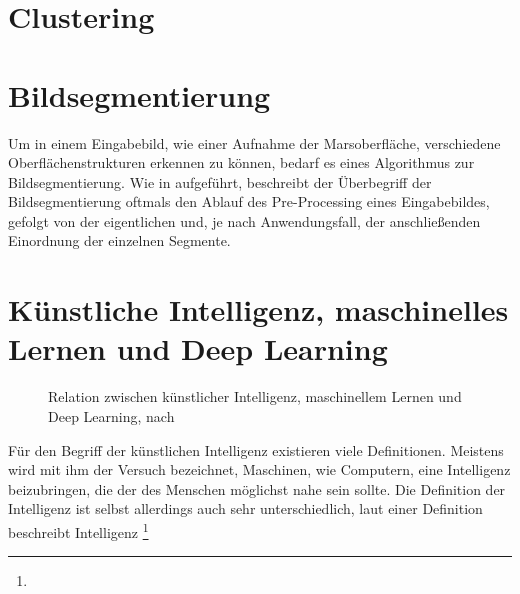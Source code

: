 \iffalse
\section{Clustering}
\label{sec:clustering}


\section{Bildsegmentierung}
\label{sec:segmentierung}

Um in einem Eingabebild, wie \zB einer Aufnahme der Marsoberfläche, verschiedene Oberflächenstrukturen erkennen zu können, bedarf es eines Algorithmus zur Bildsegmentierung. Wie in \cite{bildsegmentierung_14} aufgeführt, beschreibt der Überbegriff der Bildsegmentierung oftmals den Ablauf des Pre-Processing eines Eingabebildes, gefolgt von der eigentlichen  und, je nach Anwendungsfall, der anschließenden Einordnung der einzelnen Segmente.

\section{Künstliche Intelligenz, maschinelles Lernen und Deep Learning}

\begin{wrapfigure}{r}{0.33\textwidth}
\captionsetup{format=plain}
\caption{Relation zwischen künstlicher Intelligenz, maschinellem Lernen und Deep Learning, nach \cite[Kap.~1.1]{deeplearning_18}}
\label{fig:ai_ml_dl}
\end{wrapfigure}

Für den Begriff der künstlichen Intelligenz existieren viele Definitionen. Meistens wird mit ihm der Versuch bezeichnet, Maschinen, wie \zB Computern, eine Intelligenz beizubringen, die der des Menschen möglichst nahe sein sollte. Die Definition der Intelligenz ist selbst allerdings auch sehr unterschiedlich, laut einer Definition beschreibt Intelligenz \footnote{}

